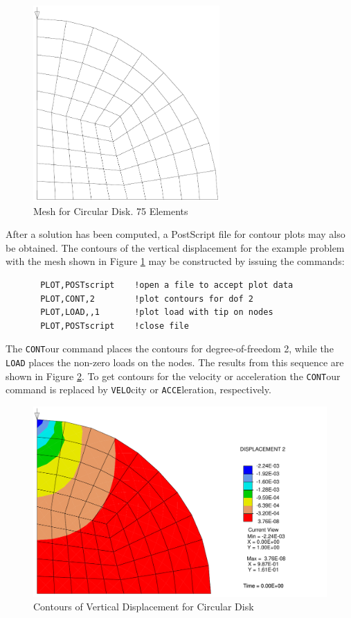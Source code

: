 \begin{figure}[ht!]
\centerline {\hfil \includegraphics[width=2.8in]{figs/fig4} \hfil}
\caption{Mesh for Circular Disk. 75 Elements}
\label{fig7}
\end{figure}

After a solution has been computed, a PostScript file for
contour plots may also be obtained.
The contours of the vertical displacement for the example problem with the
mesh shown in Figure \ref{fig7} may be constructed by issuing the commands:
\begin{verbatim}
       PLOT,POSTscript    !open a file to accept plot data
       PLOT,CONT,2        !plot contours for dof 2
       PLOT,LOAD,,1       !plot load with tip on nodes
       PLOT,POSTscript    !close file
\end{verbatim}
The {\tt CONT}our command places the contours for degree-of-freedom 2, while
the {\tt LOAD} places the non-zero loads on the nodes.
The results from this sequence are shown in Figure \ref{fig8}.
To get contours for the velocity or acceleration the {\tt CONT}our command
is replaced by {\tt VELO}city or {\tt ACCE}leration, respectively.

\begin{figure}
\centerline {\hfil \includegraphics[width=4.8in]{figs/fig5} \hfil}
\caption{Contours of Vertical Displacement for Circular Disk}
\label{fig8}
\end{figure}


